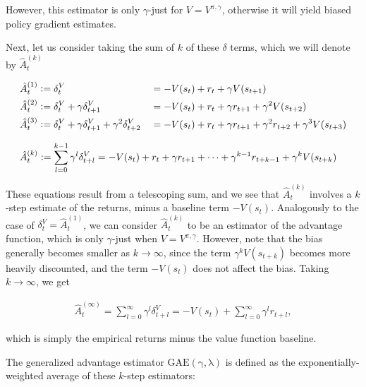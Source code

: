 However, this estimator is only $\gamma$-just for $V = V^{\pi,\gamma}$, otherwise it will yield biased policy gradient estimates.

Next, let us consider taking the sum of $k$ of these $\delta$ terms, which we will denote by $\hat{A}_t^{(k)}$

\begin{alignat}{2}
\hat{A}_t^{(1)} &\vcentcolon=  \delta^V_{t} &&= -V(s_t) + r_t + \gamma V(s_{t+1})\\
\hat{A}_t^{(2)} &\vcentcolon= \delta^V_t + \gamma \delta^V_{t+1} &&= -V(s_t) + r_t + \gamma r_{t+1} + \gamma^2 V(s_{t+2}) \label{a2}\\
\hat{A}_t^{(3)} &\vcentcolon= \delta^V_{t} + \gamma \delta^V_{t+1} + \gamma^2 \delta^V_{t+2} &&= -V(s_t) + r_t + \gamma r_{t+1} + \gamma^2 r_{t+2} + \gamma^3 V(s_{t+3}) \label{a3}
\end{alignat}

\begin{align}
\hat{A}_t^{(k)} &\vcentcolon= \sum_{l=0}^{k-1} \gamma^{l} \delta^V_{t+l} = -V(s_t) + r_t + \gamma r_{t+1} + \dots + \gamma^{k-1} r_{t+k-1} + \gamma^{k} V(s_{t+k})
\end{align}

These equations result from a telescoping sum, and we see that $\hat{A}_t^{(k)}$ involves a $k$-step estimate of the returns, minus a baseline term $-V(s_t)$. Analogously to the case of $\delta^V_t = \hat{A}_t^{(1)}$, we can consider $\hat{A}_t^{(k)}$ to be an estimator of the advantage function, which is only $\gamma$-just when $V = V^{\pi,\gamma}$. However, note that the bias generally becomes smaller as $k \rightarrow \infty$, since the term $\gamma^k V(s_{t+k})$ becomes more heavily discounted, and the term $-V(s_t)$ does not affect the bias. Taking $k \rightarrow \infty$, we get

\begin{align}
\hat{A}_t^{(\infty)} = \sum_{l=0}^{\infty} \gamma^{l} \delta^V_{t+l} = -V(s_t) + \sum_{l=0}^{\infty} \gamma^{l} r_{t+l},
\end{align}

which is simply the empirical returns minus the value function baseline.

The generalized advantage estimator $\mathrm{GAE(\gamma,\lambda)}$ is defined as the exponentially-weighted average of these $k$-step estimators:

